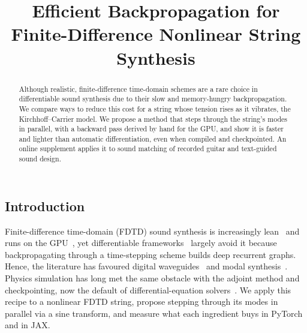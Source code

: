 \documentclass[a4paper]{article}
\title{Efficient Backpropagation for\\Finite-Difference Nonlinear String Synthesis}
\begin{document}
\ninept
\maketitle
\begin{sloppy}
\begin{abstract}
Although realistic, finite-difference time-domain schemes are a rare choice
in differentiable sound synthesis due to their slow and memory-hungry
backpropagation. We compare ways to reduce this cost for a string whose
tension rises as it vibrates, the Kirchhoff--Carrier model. We propose a
method that steps through the string's modes in parallel, with a backward
pass derived by hand for the GPU, and show it is faster and lighter than
automatic differentiation, even when compiled and checkpointed. An online
supplement applies it to sound matching of recorded guitar and
text-guided sound design.\footnotemark
\end{abstract}

\section{Introduction}
Finite-difference time-domain (FDTD) sound synthesis is increasingly lean~\cite{bilbao2024guitar} and runs on the GPU~\cite{lee2024string}, yet differentiable
frameworks~\cite{hayes2024review} largely avoid it because
backpropagating through a time-stepping scheme builds deep recurrent graphs. Hence, the literature has favoured
digital waveguides~\cite{tablas2026sound} and modal
synthesis~\cite{diaz2025}. Physics simulation has long met the same obstacle
with the adjoint method and checkpointing, now the default of
differential-equation solvers~\cite{kidger2021}.
We apply this recipe to a nonlinear FDTD string, propose stepping through
its modes in parallel via a sine transform, and measure what each
ingredient buys in PyTorch\footnotemark{} and in JAX.\footnotemark


\end{sloppy}
\end{document}
